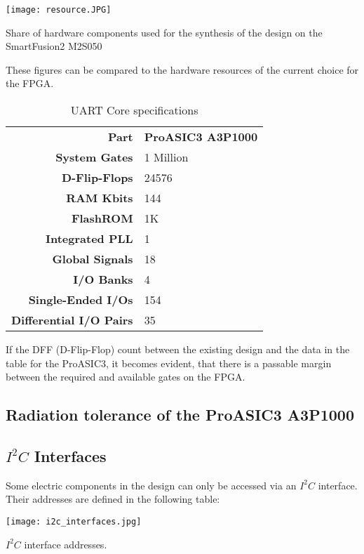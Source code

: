 \begin{table}[H]
	\centering
    \texttt{[image: resource.JPG]}
    \caption[Components]{Share of hardware components used for the synthesis of the design on the SmartFusion2 M2S050}
	\label{tab:resource}
\end{table}

These figures can be compared to the hardware resources of the current choice for the FPGA.

\begin{table}[H]

\caption[]{UART Core specifications \cite{Actel}}
    \label{tab:11}
    
  \begin{center}  
  \begin{tabular}{|r|l|}
  \hline
  \textbf{Part}  & \textbf{ProASIC3 A3P1000} \\ \cline{1-2}
  
  \textbf{System Gates} & 1 Million \\
  \textbf{D-Flip-Flops} & 24576\\ 
  \textbf{RAM Kbits} & 144 \\
  \textbf{FlashROM} & 1K\\
  \textbf{Integrated PLL} & 1 \\
  \textbf{Global Signals} & 18 \\
  \textbf{I/O Banks} & 4 \\
  \textbf{Single-Ended I/Os} & 154 \\
  \textbf{Differential I/O Pairs} & 35 \\
  \hline
  
\end{tabular}
\end{center}
\end{table}

If the DFF (D-Flip-Flop) count between the existing design and the data in the table for the ProASIC3, it becomes evident, that there is a passable margin between the required and available gates on the FPGA.


\subsection{Radiation tolerance of the ProASIC3 A3P1000}



\subsection{\texorpdfstring{$I^2C$}{TEXT} Interfaces}
\label{sec:i2c_interfaces}
Some electric components in the design can only be accessed via an $I^2C$ interface. 
Their addresses are defined in the following table:
\begin{table}[H]
	\centering
    \texttt{[image: i2c\_interfaces.jpg]}
    \caption[$I^2C$ Interfaces]{$I^2C$ interface addresses.}
	\label{tab:i2c_interfaces}
\end{table}

